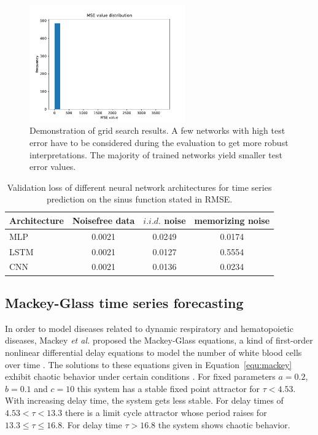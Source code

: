 \begin{figure}
    \centering
    \includegraphics[width=0.6\textwidth]{figures/histogram.pdf}
    \caption{Demonstration of grid search results. A few networks with high
    test error have to be considered during the evaluation to get more 
    robust interpretations. The majority of trained networks yield smaller
    test error values.}
    \label{fig:histogram}
\end{figure}

\begin{table}
    \centering
    \begin{tabular}{l|c|c|c}
        Architecture & Noisefree data & $i.i.d.$ noise & memorizing noise \\
        \hline
        MLP          & 0.0021         & 0.0249         & 0.0174           \\
        LSTM         & 0.0021         & 0.0127         & 0.5554           \\
        CNN          & 0.0021         & 0.0136         & 0.0234           \\
    \end{tabular}
    \caption{Validation loss of different neural network architectures for
        time series prediction on the sinus function stated
        in RMSE.}
    \label{tab:noise_finals}
\end{table}

\subsection{Mackey-Glass time series forecasting}

In order to model diseases related to dynamic respiratory and hematopoietic
diseases, Mackey \textit{et al.} proposed the Mackey-Glass equations, a kind of
first-order nonlinear differential delay equations to model
the number of white blood cells over time \cite{mackey1977}. The solutions to
these equations given in Equation~\ref{equ:mackey}
exhibit chaotic behavior under certain conditions \cite{farmer1982}. For fixed
parameters $a = 0.2$, $b=0.1$ and $c=10$ this system has a stable fixed point
attractor for $\tau < 4.53$. With increasing delay time, the system gets less
stable. For delay times of $4.53 < \tau < 13.3$ there is a limit cycle attractor
whose period raises for $13.3 \leq \tau \leq 16.8$. For delay time
$\tau > 16.8$ the system shows chaotic behavior.

